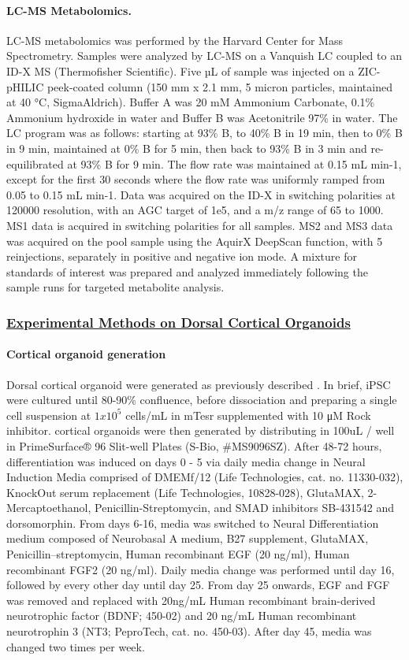 \documentclass[12pt]{article}
\begin{document}
\paragraph{LC-MS Metabolomics.}
LC-MS metabolomics was performed by the Harvard Center for Mass Spectrometry. Samples were analyzed by LC-MS on a Vanquish LC coupled to an ID-X MS (Thermofisher Scientific). Five µL of sample was injected on a ZIC-pHILIC peek-coated column (150 mm x 2.1 mm, 5 micron particles, maintained at 40 °C, SigmaAldrich). Buffer A was 20 mM Ammonium Carbonate, 0.1\% Ammonium hydroxide in water and Buffer B was Acetonitrile 97\% in water. The LC program was as follows: starting at 93\% B, to 40\% B in 19 min, then to 0\% B in 9 min, maintained at 0\% B for 5 min, then back to 93\% B in 3 min and re-equilibrated at 93\% B for 9 min. The flow rate was maintained at 0.15 mL min-1, except for the first 30 seconds where the flow rate was uniformly ramped from 0.05 to 0.15 mL min-1. Data was acquired on the ID-X in switching polarities at 120000 resolution, with an AGC target of 1e5, and a m/z range of 65 to 1000. MS1 data is acquired in switching polarities for all samples. MS2 and MS3 data was acquired on the pool sample using the AquirX DeepScan function, with 5 reinjections, separately in positive and negative ion mode. A mixture for standards of interest was prepared and analyzed immediately following the sample runs for targeted metabolite analysis.

 \subsubsection{\underline{Experimental Methods on Dorsal Cortical Organoids}} 

\paragraph{Cortical organoid generation}
Dorsal cortical organoid were generated as previously described \cite{Sloan2018-ja}. In brief, iPSC were cultured until 80-90\% confluence, before dissociation and preparing a single cell suspension at $1 x 10^5$ cells/mL in mTesr supplemented with 10 μM Rock inhibitor. cortical organoids were then generated by distributing in 100uL / well in PrimeSurface® 96 Slit-well Plates (S-Bio, #MS9096SZ). After 48-72 hours, differentiation was induced on days 0 - 5 via daily media change in Neural Induction Media comprised of DMEMf/12 (Life Technologies, cat. no. 11330-032), KnockOut serum replacement (Life Technologies, 10828-028), GlutaMAX, 2-Mercaptoethanol, Penicillin-Streptomycin, and SMAD inhibitors SB-431542 and dorsomorphin. From days 6-16, media was switched to Neural Differentiation medium composed of Neurobasal A medium, B27 supplement, GlutaMAX, Penicillin–streptomycin, Human recombinant EGF (20 ng/ml), Human recombinant FGF2 (20 ng/ml). Daily media change was performed until day 16, followed by every other day until day 25. From day 25 onwards, EGF and FGF was removed and replaced with 20ng/mL Human recombinant brain-derived neurotrophic factor (BDNF; 450-02) and 20 ng/mL Human recombinant neurotrophin 3 (NT3; PeproTech, cat. no. 450-03). After day 45, media was changed two times per week. 
\end{document}
